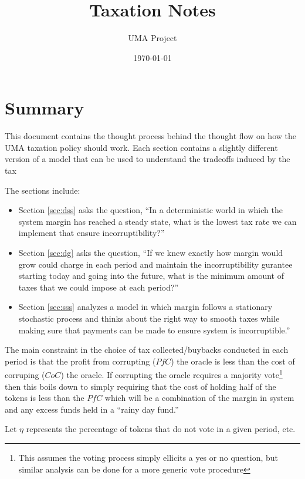 \documentclass[12pt]{article}
\title{Taxation Notes}
\author{UMA Project}
\date{\today}
\begin{document}
\maketitle


\section{Summary}

  This document contains the thought process behind the thought flow on how the UMA taxation
  policy should work. Each section contains a slightly different version of a model that can be used
  to understand the tradeoffs induced by the tax

  The sections include:

  \begin{itemize}
    \item Section \ref{sec:dss} asks the question, ``In a deterministic world in which the system
          margin has reached a steady state, what is the lowest tax rate we can implement that
          ensure incorruptibility?''
    \item Section \ref{sec:dg} asks the question, ``If we knew exactly how margin would grow
          could charge in each period and maintain the incorruptibility gurantee
          starting today and going into the future, what is the minimum amount of taxes that we
          could impose at each period?''
    \item Section \ref{sec:sss} analyzes a model in which margin follows a stationary stochastic
          process and thinks about the right way to smooth taxes while making sure that payments
          can be made to ensure system is incorruptible.''
  \end{itemize}

  The main constraint in the choice of tax collected/buybacks conducted in each period is that the
  profit from corrupting ($PfC$) the oracle is less than the cost of corruping ($CoC$) the oracle.
  If corrupting the oracle requires a majority vote\footnote{This assumes the voting process simply
  ellicits a yes or no question, but similar analysis can be done for a more generic vote procedure}
  then this boils down to simply requiring that the cost of holding half of the tokens is less than
  the $PfC$ which will be a combination of the margin in system and any excess funds held in a
  ``rainy day fund.''

  Let $\eta$ represents the percentage of tokens that do not vote in a given period, etc.
\end{document}
